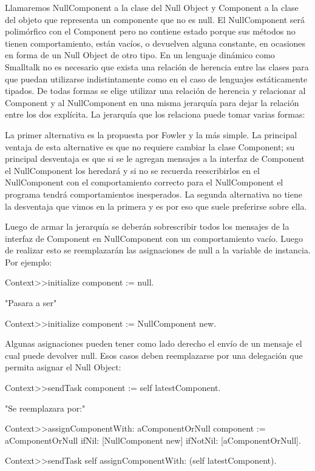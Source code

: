 Llamaremos NullComponent a la clase del Null Object y Component a la clase del objeto que representa
un componente que no es null. El NullComponent será polimórfico con el Component pero no contiene
estado porque sus métodos no tienen comportamiento, están vacíos, o devuelven alguna constante, en
ocasiones en forma de un Null Object de otro tipo. En un lenguaje dinámico como Smalltalk no es
necesario que exista una relación de herencia entre las clases para que puedan utilizarse
indistintamente como en el caso de lenguajes estáticamente tipados. De todas formas se elige
utilizar una relación de herencia y relacionar al Component y al NullComponent en una misma
jerarquía para dejar la relación entre los dos explícita. La jerarquía que los relaciona puede tomar
varias formas:


La primer alternativa es la propuesta por Fowler y la más simple. La principal ventaja de esta
alternative es que no requiere cambiar la clase Component; su principal desventaja es que si se le
agregan mensajes a la interfaz de Component el NullComponent los heredará y si no se recuerda
reescribirlos en el NullComponent con el comportamiento correcto para el NullComponent el programa
tendrá comportamientos inesperados. La segunda alternativa no tiene la desventaja que vimos en la
primera y es por eso que suele preferirse sobre ella.

Luego de armar la jerarquía se deberán sobrescribir todos los mensajes de la interfaz de Component
en NullComponent con un comportamiento vacío. Luego de realizar esto se reemplazarán las asignaciones de
null a la variable de instancia. Por ejemplo:

\begin{code}
Context>>initialize
    component := null.

"Pasara a ser"

Context>>initialize
    component := NullComponent new.
\end{code}

Algunas asignaciones pueden tener como lado derecho el envío de un mensaje el cual puede devolver 
null. Esos casos deben reemplazarse por una delegación que permita asignar el Null Object:

\begin{code}
Context>>sendTask
    component := self latestComponent.

"Se reemplazara por:"

Context>>assignComponentWith: aComponentOrNull
    component := aComponentOrNull ifNil: [NullComponent new] ifNotNil: [aComponentOrNull].

Context>>sendTask
    self assignComponentWith: (self latestComponent).
\end{code}

